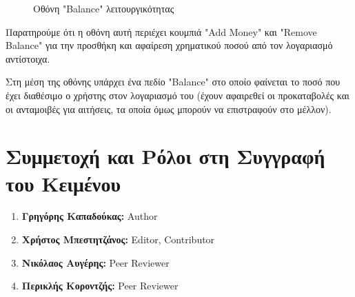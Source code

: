 \documentclass[12pt,a4paper]{article}
\begin{document}
\begin{figure}[H]
	\caption{Οθόνη "Balance" λειτουργικότητας}
	\label{Οθόνη "Balance" λειτουργικότητας}
\end{figure}

Παρατηρούμε ότι η οθόνη αυτή περιέχει κουμπιά "Add Money" και "Remove Balance" για την προσθήκη και αφαίρεση χρηματικού ποσού από τον λογαριασμό αντίστοιχα.

Στη μέση της οθόνης υπάρχει ένα πεδίο "Balance" στο οποίο φαίνεται το ποσό που έχει διαθέσιμο ο χρήστης στον λογαριασμό του (έχουν αφαιρεθεί οι προκαταβολές και οι ανταμοιβές για αιτήσεις, τα οποία όμως μπορούν να επιστραφούν στο μέλλον).

\section{Συμμετοχή και Ρόλοι στη Συγγραφή του Κειμένου}

\begin{enumerate}
	\item \textbf{Γρηγόρης Καπαδούκας:} Author
	\item \textbf{Χρήστος Μπεστητζάνος:} Editor, Contributor
	\item \textbf{Νικόλαος Αυγέρης:} Peer Reviewer
	\item \textbf{Περικλής Κοροντζής:} Peer Reviewer
\end{enumerate}
\end{document}
